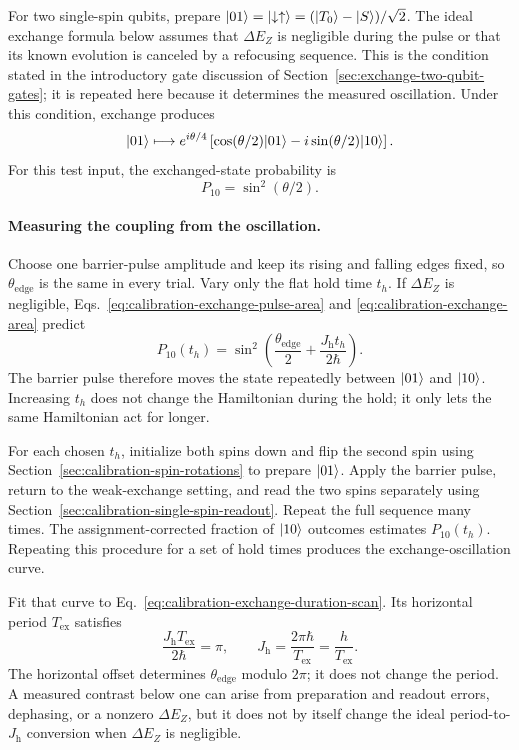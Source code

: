 For two single-spin qubits, prepare
$\lvert 01\rangle=\lvert \downarrow\uparrow\rangle=(\lvert T_0\rangle-\lvert S\rangle)/\sqrt2$.
The ideal exchange formula below assumes that $\Delta E_Z$ is
negligible during the pulse or that its known evolution is canceled
by a refocusing sequence. This is the condition stated in the
introductory gate discussion of
Section~\ref{sec:exchange-two-qubit-gates}; it is repeated here
because it determines the measured oscillation. Under this condition,
exchange produces
\[
 \lvert 01\rangle\longmapsto
 e^{i\theta/4}
 \left[\cos(\theta/2)\lvert 01\rangle-i\sin(\theta/2)\lvert 10\rangle\right].
\]
For this test input, the exchanged-state probability is
\begin{equation}
 P_{10}=\sin^2(\theta/2).
 \label{eq:calibration-exchange-area}
\end{equation}

\paragraph{Measuring the coupling from the oscillation.}
Choose one barrier-pulse amplitude and keep its rising and falling
edges fixed, so $\theta_{\mathrm{edge}}$ is the same in every trial.
Vary only the flat hold time $t_h$. If $\Delta E_Z$ is negligible,
Eqs.~\eqref{eq:calibration-exchange-pulse-area} and
\eqref{eq:calibration-exchange-area} predict
\begin{equation}
 P_{10}(t_h)=
 \sin^2\!\left(\frac{\theta_{\mathrm{edge}}}{2}
                +\frac{J_{\mathrm h}t_h}{2\hbar}\right).
 \label{eq:calibration-exchange-duration-scan}
\end{equation}
The barrier pulse therefore moves the state repeatedly between
$\lvert 01\rangle$ and $\lvert 10\rangle$. Increasing $t_h$ does not change the
Hamiltonian during the hold; it only lets the same Hamiltonian act
for longer.

For each chosen $t_h$, initialize both spins down and flip the
second spin using Section~\ref{sec:calibration-spin-rotations} to
prepare $\lvert 01\rangle$. Apply the barrier pulse, return to the
weak-exchange setting, and read the two spins separately using
Section~\ref{sec:calibration-single-spin-readout}. Repeat the full
sequence many times. The assignment-corrected fraction of
$\lvert 10\rangle$ outcomes estimates $P_{10}(t_h)$. Repeating this procedure
for a set of hold times produces the exchange-oscillation curve.

Fit that curve to
Eq.~\eqref{eq:calibration-exchange-duration-scan}. Its horizontal
period $T_{\mathrm{ex}}$ satisfies
\begin{equation}
 \frac{J_{\mathrm h}T_{\mathrm{ex}}}{2\hbar}=\pi,
 \qquad
 J_{\mathrm h}=\frac{2\pi\hbar}{T_{\mathrm{ex}}}
              =\frac{h}{T_{\mathrm{ex}}}.
 \label{eq:calibration-exchange-from-period}
\end{equation}
The horizontal offset determines $\theta_{\mathrm{edge}}$ modulo
$2\pi$; it does not change the period. A measured contrast below
one can arise from preparation and readout errors, dephasing, or a
nonzero $\Delta E_Z$, but it does not by itself change the ideal
period-to-$J_{\mathrm h}$ conversion when $\Delta E_Z$ is negligible.

